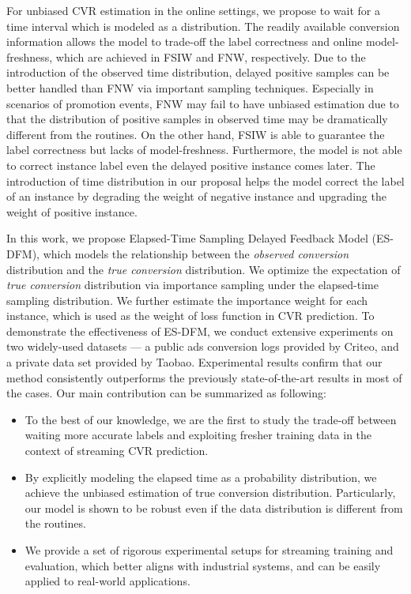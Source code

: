 \documentclass[letterpaper]{article}
\newcommand{\mus}{Taobao}
\newcommand{\modelname}{Elapsed-Time Sampling Delayed Feedback Model}
\newcommand{\modelnameabb}{ES-DFM}
\begin{document}
For unbiased CVR estimation in the online settings, we propose to wait for a time interval which is modeled as a distribution. The readily available conversion information allows the model to trade-off the label correctness and online model-freshness, which are achieved in FSIW and FNW, respectively. Due to the introduction of the observed time distribution, delayed positive samples can be better handled than FNW via important sampling techniques. Especially in scenarios of promotion events, FNW may fail to have unbiased estimation due to that the distribution of positive samples in observed time may be dramatically different from the routines. On the other hand, FSIW is able to guarantee the label correctness but lacks of model-freshness. Furthermore, the model is not able to correct instance label even the delayed positive instance comes later. The introduction of time distribution in our proposal helps the model correct the label of an instance by degrading the weight of negative instance and upgrading the weight of positive instance.

In this work, we propose \modelname{} (\modelnameabb{}), which models the relationship between the \textit{observed conversion} distribution and the \textit{true conversion} distribution. We optimize the expectation of \textit{true conversion} distribution via importance sampling under the elapsed-time sampling distribution. We further estimate the importance weight for each instance, which is used as the weight of loss function in CVR prediction. To demonstrate the effectiveness of \modelnameabb{}, we conduct extensive experiments on two widely-used datasets --- a public ads conversion logs provided by Criteo, and a private data set provided by \mus. Experimental results confirm that our method consistently outperforms the previously state-of-the-art results in most of the cases. Our main contribution can be summarized as following:

\begin{itemize}
\item{To the best of our knowledge, we are the first to study the trade-off between waiting more accurate labels and exploiting fresher training data in the context of streaming CVR prediction.}

\item{By explicitly modeling the elapsed time as a probability distribution, we achieve the unbiased estimation of true conversion distribution. Particularly, our model is shown to be robust even if the data distribution is different from the routines.}

\item{We provide a set of rigorous experimental setups for streaming training and evaluation, which better aligns with industrial systems, and can be easily applied to real-world applications.}

\end{itemize}
\end{document}
